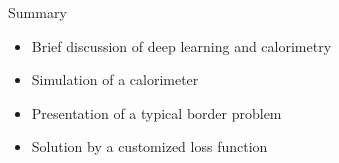 \documentclass[10pt]{beamer}
\begin{document}
\begin{frame}{Summary}
  \begin{itemize}
  \item Brief discussion of deep learning and calorimetry 
  \item Simulation of a calorimeter
  \item Presentation of a typical border problem
  \item Solution by a  customized loss function
  \end{itemize}
\end{frame}
\end{document}
